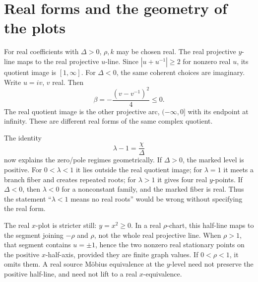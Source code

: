 \section{Real forms and the geometry of the plots}\label{sec:real}

For real coefficients with \(\Delta>0\), \(\rho,k\) may be chosen real. The real projective \(y\)-line maps to the real projective \(u\)-line. Since \(|u+u^{-1}|\ge2\) for nonzero real \(u\), its quotient image is \([1,\infty]\). For \(\Delta<0\), the same coherent choices are imaginary. Write \(u=iv\), \(v\) real. Then
\[
\beta=-\frac{(v-v^{-1})^2}{4}\le0.
\]
The real quotient image is the other projective arc, \((-\infty,0]\) with its endpoint at infinity. These are different real forms of the same complex quotient.

The identity
\begin{equation}\label{eq:chi-lambda}
\lambda-1=\frac{\chi}{\Delta}
\end{equation}
now explains the zero/pole regimes geometrically. If \(\Delta>0\), the marked level is positive. For \(0<\lambda<1\) it lies outside the real quotient image; for \(\lambda=1\) it meets a branch fiber and creates repeated roots; for \(\lambda>1\) it gives four real \(y\)-points. If \(\Delta<0\), then \(\lambda<0\) for a nonconstant family, and the marked fiber is real. Thus the statement ``\(\lambda<1\) means no real roots'' would be wrong without specifying the real form.

The real \(x\)-plot is stricter still: \(y=x^2\ge0\). In a real \(\rho\)-chart, this half-line maps to the segment joining \(-\rho\) and \(\rho\), not the whole real projective line. When \(\rho>1\), that segment contains \(u=\pm1\), hence the two nonzero real stationary points on the positive \(x\)-half-axis, provided they are finite graph values. If \(0<\rho<1\), it omits them. A real source Möbius equivalence at the \(y\)-level need not preserve the positive half-line, and need not lift to a real \(x\)-equivalence.


